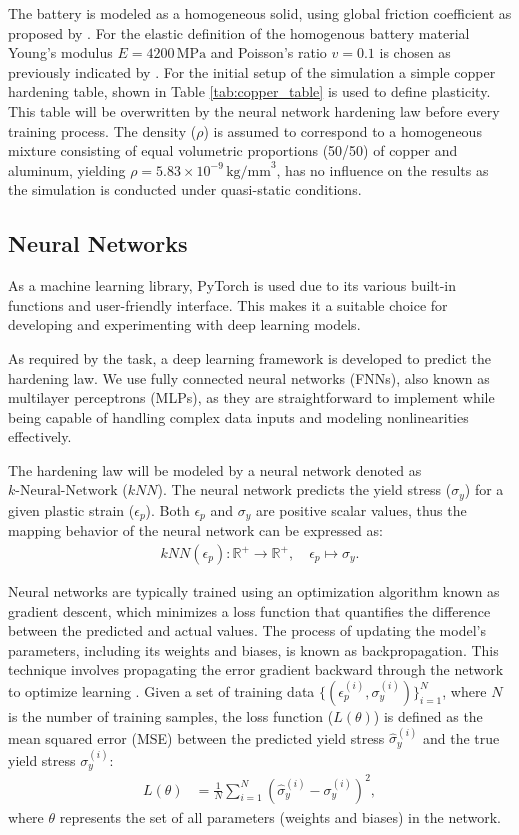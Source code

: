 The battery is modeled as a homogeneous solid, using global friction coefficient as proposed by \citet{Tancogne-Ind}. For the elastic definition of the homogenous battery material Young's modulus $E = 4200 \, \text{MPa}$ and Poisson's ratio $v = 0.1$ is chosen as previously indicated by \citet{Chung2018}. For the initial setup of the simulation a simple copper hardening table, shown in Table \ref{tab:copper_table} is used to define plasticity. This table will be overwritten by the neural network hardening law before every training process. The density ($\rho$) is assumed to correspond to a homogeneous mixture consisting of equal volumetric proportions (50/50) of copper and aluminum, yielding $\rho = 5.83 \times 10^{-9} \, \text{kg/mm}^3$, has no influence on the results as the simulation is conducted under quasi-static conditions.


\subsection{Neural Networks}
As a machine learning library, PyTorch is used due to its various built-in functions and user-friendly interface. This makes it a suitable choice for developing and experimenting with deep learning models.

As required by the task, a deep learning framework is developed to predict the hardening law. We use fully connected neural networks (FNNs), also known as multilayer perceptrons (MLPs), as they are straightforward to implement while being capable of handling complex data inputs and modeling nonlinearities effectively.

The hardening law will be modeled by a neural network denoted as \( k\text{-Neural-Network} \) (\(kNN\)). The neural network predicts the yield stress (\(\sigma_y\)) for a given plastic strain (\(\epsilon_p\)). Both \(\epsilon_p\) and \(\sigma_y\) are positive scalar values, thus the mapping behavior of the neural network can be expressed as:
\begin{align*}
kNN(\epsilon_p) : \mathbb{R}^+ \rightarrow \mathbb{R}^+, \quad \epsilon_p \mapsto \sigma_y.
\end{align*}

Neural networks are typically trained using an optimization algorithm known as gradient descent, which minimizes a loss function that quantifies the difference between the predicted and actual values. The process of updating the model's parameters, including its weights and biases, is known as backpropagation. This technique involves propagating the error gradient backward through the network to optimize learning \citep{bishop2006pattern}.
Given a set of training data \(\{(\epsilon_p^{(i)}, \sigma_y^{(i)})\}_{i=1}^N\), where \(N\) is the number of training samples, the loss function (\(L(\theta)\)) is defined as the mean squared error (MSE) between the predicted yield stress \(\hat{\sigma}_y^{(i)}\) and the true yield stress \(\sigma_y^{(i)}\):
\begin{align*}
L(\theta) &= \frac{1}{N} \sum_{i=1}^N \left(\hat{\sigma}_y^{(i)} - \sigma_y^{(i)}\right)^2,
\end{align*}
where \(\theta\) represents the set of all parameters (weights and biases) in the network.

